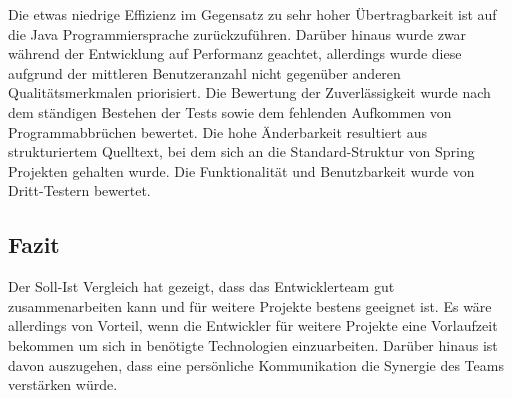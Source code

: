 Die etwas niedrige Effizienz im Gegensatz zu sehr hoher Übertragbarkeit ist auf die Java Programmiersprache zurückzuführen.
Darüber hinaus wurde zwar während der Entwicklung auf Performanz geachtet, allerdings wurde diese aufgrund
der mittleren Benutzeranzahl nicht gegenüber anderen Qualitätsmerkmalen priorisiert.
Die Bewertung der Zuverlässigkeit wurde nach dem ständigen Bestehen der Tests sowie dem fehlenden Aufkommen von Programmabbrüchen bewertet.
Die hohe Änderbarkeit resultiert aus strukturiertem Quelltext, bei dem sich an die Standard-Struktur von Spring Projekten gehalten wurde.
Die Funktionalität und Benutzbarkeit wurde von Dritt-Testern bewertet.

\subsection{Fazit}
Der Soll-Ist Vergleich hat gezeigt, dass das Entwicklerteam gut zusammenarbeiten kann und für weitere Projekte bestens geeignet ist.
Es wäre allerdings von Vorteil, wenn die Entwickler für weitere Projekte eine Vorlaufzeit bekommen um sich in benötigte
Technologien einzuarbeiten. Darüber hinaus ist davon auszugehen, dass eine persönliche Kommunikation die Synergie des Teams
verstärken würde.







